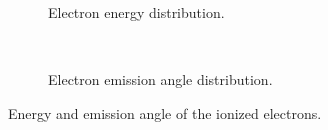 \begin{figure}[!ht]
	\begin{subfigure}[t]{0.5\textwidth}
		
		\caption{Electron energy distribution.}
		\label{}
	\end{subfigure}
	~
	\begin{subfigure}[t]{0.5\textwidth}
		
		\caption{Electron emission angle distribution.}
		\label{}
	\end{subfigure}
	\caption[Energy and emission angle of the ionized electrons]{Energy and emission angle of the ionized electrons.}
	\label{chap3:garfieldangle}
\end{figure}
